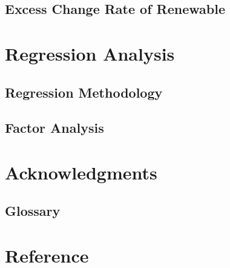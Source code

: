 \documentclass[11pt]{article}
\numberwithin{equation}{section}
\numberwithin{table}{section}
\numberwithin{figure}{section}
\begin{document}
\subsection{Excess Change Rate of Renewable}





\newpage
\section{Regression Analysis} \label{sec:regression}

\subsection{Regression Methodology}

\subsection{Factor Analysis}






\newpage
\section{Acknowledgments} \label{sec:thanks}






\begin{appendices}

\newpage
\section{Glossary} \label{sec:}


\end{appendices}




\newpage
\section*{Reference} \label{sec:ref}
\end{document}
